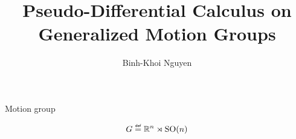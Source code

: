 \documentclass{beamer}
\title{Pseudo-Differential Calculus on Generalized Motion Groups}
\author{Binh-Khoi Nguyen}
\begin{document}
\maketitle

\begin{frame}{Motion group}
    \begin{definition}
        \begin{align*}
            \Group \defeq \R^n \rtimes \SpecialOrthogonalGroup n
        \end{align*}
    \end{definition}
\end{frame}
\end{document}
